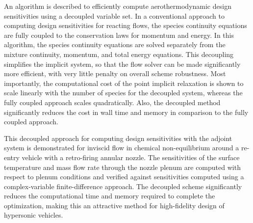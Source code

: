 \documentclass[a4paper]{article}
\begin{document}
An algorithm is described to efficiently compute aerothermodynamic design
sensitivities using a decoupled variable set.  In a conventional approach to
computing design sensitivities for reacting flows, the species continuity
equations are fully coupled to the conservation laws for momentum and energy. In
this algorithm, the species continuity equations are solved separately from the
mixture continuity, momentum, and total energy equations. This decoupling
simplifies the implicit system, so that the flow solver can be made
significantly more efficient, with very little penalty on overall scheme
robustness.  Most importantly, the computational cost of the point implicit
relaxation is shown to scale linearly with the number of species for the
decoupled system, whereas the fully coupled approach scales quadratically. Also,
the decoupled method significantly reduces the cost in wall time and memory in
comparison to the fully coupled approach. 

This decoupled approach for computing design sensitivities with the adjoint
system is demonstrated for inviscid flow in chemical non-equilibrium around a
re-entry vehicle with a retro-firing annular nozzle. The sensitivities of the
surface temperature and mass flow rate through the nozzle plenum are computed
with respect to plenum conditions and verified against sensitivities computed
using a complex-variable finite-difference approach.  The decoupled scheme
significantly reduces the computational time and memory required to complete the
optimization, making this an attractive method for high-fidelity design of
hypersonic vehicles.
\end{document}
